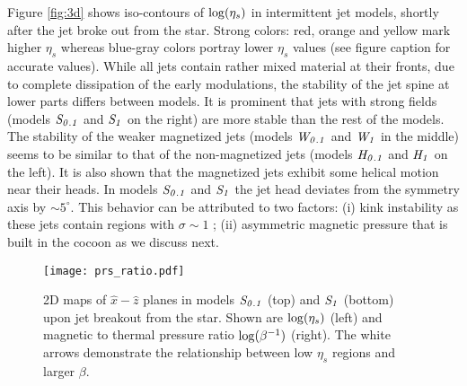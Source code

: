 \documentclass[fleqn,usenatbib]{mnras}
\newcommand{\Ha}{{\it H_{0.1}}}
\newcommand{\Hb}{{\it H_{1}}}
\newcommand{\Wa}{{\it W_{0.1}}}
\newcommand{\Wb}{{\it W_{1}}}
\newcommand{\Sa}{{\it S_{0.1}}}
\newcommand{\Sb}{{\it S_{1}}}
\begin{document}
	Figure \ref{fig:3d} shows iso-contours of $ {\rm log}(\eta_s) $ in intermittent jet models, shortly after the jet broke out from the star. Strong colors: red, orange and yellow mark higher $ \eta_s $ whereas blue-gray colors portray lower $ \eta_s $ values (see figure caption for accurate values).
	While all jets contain rather mixed material at their fronts, due to complete dissipation of the early modulations, the stability of the jet spine at lower parts differs between models.
	It is prominent that jets with strong fields (models $\Sa $ and $ \Sb $ on the right) are more stable than the rest of the models. The stability of the weaker magnetized jets (models $\Wa $ and $ \Wb $ in the middle) seems to be similar to that of the non-magnetized jets (models $\Ha $ and $ \Hb $ on the left). It is also shown that the magnetized jets exhibit some helical motion near their heads.
	In models $ \Sa $ and $ \Sb $ the jet head deviates from the symmetry axis by $ \sim 5^\circ$. This behavior can be attributed to two factors: (i) kink instability as these jets contain regions with $ \sigma \sim 1 $ \citep{Mizuno2009,Mizuno2012,Bromberg2016,Tchekhovskoy2016,Barniol2017}; (ii) asymmetric magnetic pressure that is built in the cocoon as we discuss next.
	
	\begin{figure}
		\centering
		\texttt{[image: prs\_ratio.pdf]}
		\caption[2D maps]{
			2D maps of $ \hat{x}-\hat{z} $ planes in models $ \Sa $ (top) and $ \Sb $ (bottom) upon jet breakout from the star. Shown are $ {\rm log}(\eta_s) $ (left) and magnetic to thermal pressure ratio $ {\rm log}(\beta^{-1}) $ (right). The white arrows demonstrate the relationship between low $ \eta_s $ regions and larger $ \beta $.
		}
		\label{fig:2d_maps}
	\end{figure}
	
\end{document}

